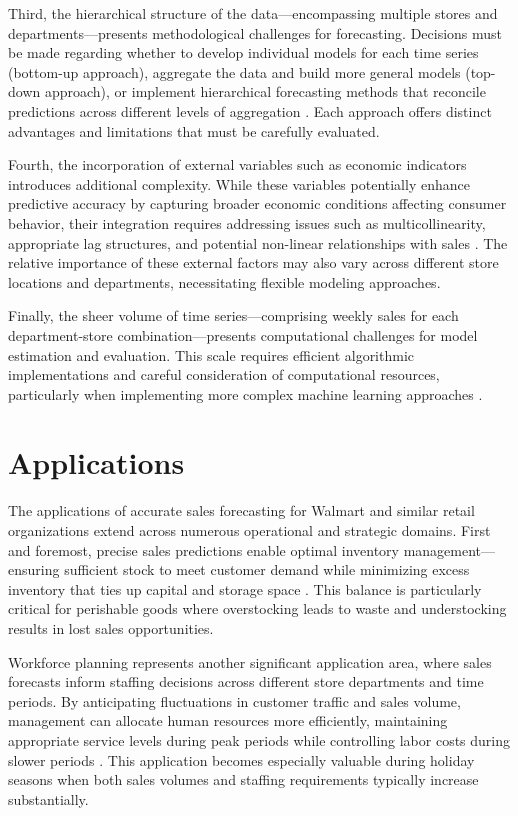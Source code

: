 Third, the hierarchical structure of the data—encompassing multiple stores and departments—presents methodological challenges for forecasting. Decisions must be made regarding whether to develop individual models for each time series (bottom-up approach), aggregate the data and build more general models (top-down approach), or implement hierarchical forecasting methods that reconcile predictions across different levels of aggregation \cite{Fildes:2019}. Each approach offers distinct advantages and limitations that must be carefully evaluated.

Fourth, the incorporation of external variables such as economic indicators introduces additional complexity. While these variables potentially enhance predictive accuracy by capturing broader economic conditions affecting consumer behavior, their integration requires addressing issues such as multicollinearity, appropriate lag structures, and potential non-linear relationships with sales \cite{Zhang:2021}. The relative importance of these external factors may also vary across different store locations and departments, necessitating flexible modeling approaches.

Finally, the sheer volume of time series—comprising weekly sales for each department-store combination—presents computational challenges for model estimation and evaluation. This scale requires efficient algorithmic implementations and careful consideration of computational resources, particularly when implementing more complex machine learning approaches \cite{Pao:2017}.

\section{Applications}

The applications of accurate sales forecasting for Walmart and similar retail organizations extend across numerous operational and strategic domains. First and foremost, precise sales predictions enable optimal inventory management—ensuring sufficient stock to meet customer demand while minimizing excess inventory that ties up capital and storage space \cite{Zhang:2021}. This balance is particularly critical for perishable goods where overstocking leads to waste and understocking results in lost sales opportunities.

Workforce planning represents another significant application area, where sales forecasts inform staffing decisions across different store departments and time periods. By anticipating fluctuations in customer traffic and sales volume, management can allocate human resources more efficiently, maintaining appropriate service levels during peak periods while controlling labor costs during slower periods \cite{Fildes:2019}. This application becomes especially valuable during holiday seasons when both sales volumes and staffing requirements typically increase substantially.


